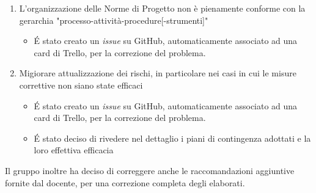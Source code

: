 \begin{enumerate}
\begin{itemize}
	\end{itemize}
	\item L'organizzazione delle Norme di Progetto non è pienamente conforme con la gerarchia "processo-attività-procedure[-strumenti]"
	\begin{itemize}
		\item \'E stato creato un \textit{issue} su GitHub, automaticamente associato ad una card di Trello, per la correzione del problema.
	\end{itemize}
	\item Migiorare attualizzazione dei rischi, in particolare nei casi in cui le misure correttive non siano state efficaci
	\begin{itemize}
		\item \'E stato creato un \textit{issue} su GitHub, automaticamente associato ad una card di Trello, per la correzione del problema.
		\item \'E stato deciso di rivedere nel dettaglio i piani di contingenza adottati e la loro effettiva efficacia
	\end{itemize}	
\end{enumerate}
\noindent
Il gruppo inoltre ha deciso di correggere anche le raccomandazioni aggiuntive fornite dal docente, per
una correzione completa degli elaborati.
